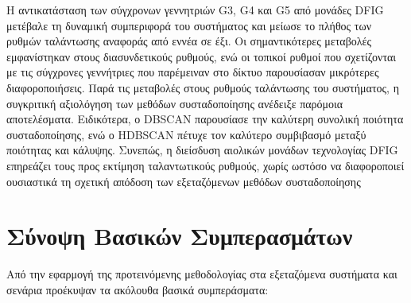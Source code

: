 Η αντικατάσταση των σύγχρονων γεννητριών G3, G4 και G5 από μονάδες \textenglish{DFIG} μετέβαλε τη δυναμική συμπεριφορά του συστήματος και μείωσε το πλήθος των  ρυθμών ταλάντωσης αναφοράς από εννέα σε έξι. Οι σημαντικότερες μεταβολές εμφανίστηκαν στους διασυνδετικούς ρυθμούς, ενώ οι τοπικοί ρυθμοί που σχετίζονται με τις σύγχρονες γεννήτριες που παρέμειναν στο δίκτυο παρουσίασαν μικρότερες διαφοροποιήσεις. Παρά τις μεταβολές στους ρυθμούς ταλάντωσης του συστήματος, η συγκριτική αξιολόγηση των μεθόδων συσταδοποίησης ανέδειξε παρόμοια αποτελέσματα. Ειδικότερα, ο DBSCAN παρουσίασε την καλύτερη συνολική ποιότητα συσταδοποίησης, ενώ ο HDBSCAN πέτυχε τον καλύτερο συμβιβασμό μεταξύ ποιότητας και κάλυψης. Συνεπώς, η διείσδυση αιολικών μονάδων τεχνολογίας DFIG επηρεάζει τους προς εκτίμηση ταλαντωτικούς ρυθμούς, χωρίς ωστόσο να διαφοροποιεί ουσιαστικά τη σχετική απόδοση των εξεταζόμενων μεθόδων συσταδοποίησης

\section{Σύνοψη Βασικών Συμπερασμάτων}

Από την εφαρμογή της προτεινόμενης μεθοδολογίας στα εξεταζόμενα συστήματα
και σενάρια προέκυψαν τα ακόλουθα βασικά συμπεράσματα:

